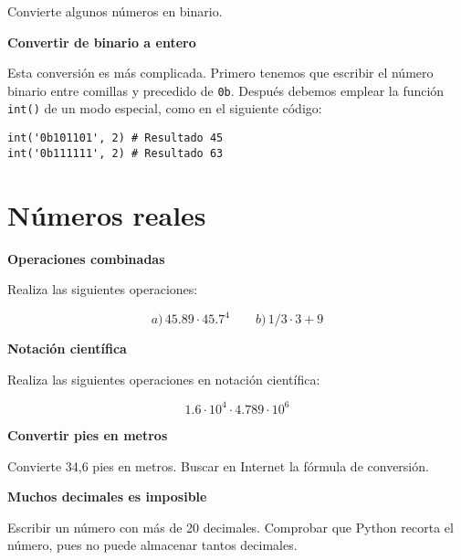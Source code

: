 \documentclass[a4paper, 11pt]{scrartcl}
\newenvironment{code}{\begin{tcolorbox}[colback=red!2!white]}{\end{tcolorbox}}
\begin{document}
Convierte algunos números en binario.





\noindent\textbf{\sffamily \dag{} Convertir de binario a entero}

Esta conversión es más complicada. Primero tenemos que escribir el número binario entre comillas y precedido de \verb|0b|. Después debemos emplear la función \verb|int()| de un modo especial, como en el siguiente código:

\smallskip

\begin{code}

\begin{verbatim}
int('0b101101', 2) # Resultado 45
int('0b111111', 2) # Resultado 63
\end{verbatim}

\end{code}





\newpage

\section{Números reales}





\noindent\textbf{\sffamily Operaciones combinadas}

Realiza las siguientes operaciones:

$$
a)\,45.89 \cdot 45.7^4\qquad b)\, 1/3\cdot 3 + 9
$$





\noindent\textbf{\sffamily Notación científica}

Realiza las siguientes operaciones en notación científica:

$$
1.6 \cdot 10^4 \cdot 4.789 \cdot 10^6
$$





\noindent\textbf{\sffamily Convertir pies en metros}

Convierte 34,6 pies en metros. Buscar en Internet la fórmula de conversión.






\noindent\textbf{\sffamily Muchos decimales es imposible}

Escribir un número con más de 20 decimales. Comprobar que Python recorta el número, pues no puede almacenar tantos decimales.
\end{document}

